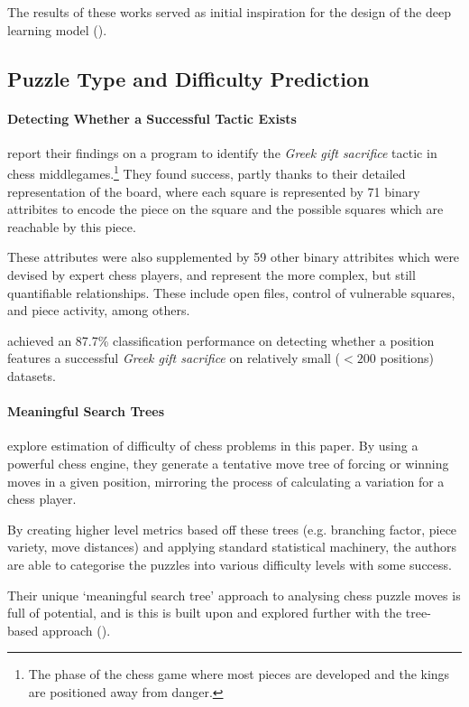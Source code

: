 The results of these works served as initial inspiration for the design of the
deep learning model ().

\subsection{Puzzle Type and Difficulty Prediction}

\paragraph{Detecting Whether a Successful Tactic
Exists}\citet{middleGamePatterns} report their findings on a program to
identify the \emph{Greek gift sacrifice} tactic in chess
middlegames.\footnote{The phase of the chess game where most pieces are
developed and the kings are positioned away from danger.} They found success,
partly thanks to their detailed representation of the board, where each square
is represented by 71 binary attribites \citep{middleGamePatterns} to encode the
piece on the square and the possible squares which are reachable by this piece. 

These attributes were also supplemented by 59 other binary attribites which
were devised by expert chess players, and represent the more complex, but still
quantifiable relationships. These include open files, control of vulnerable
squares, and piece activity, among others.

\citet{middleGamePatterns} achieved an 87.7\% classification performance on
detecting whether a position features a successful \emph{Greek gift sacrifice}
on relatively small ($<200$ positions) datasets. 

\paragraph{Meaningful Search Trees}\citet{chessTrees} explore estimation of
difficulty of chess problems in this paper. By using a powerful chess engine,
they generate a tentative move tree of forcing or winning moves in a given
position, mirroring the process of calculating a variation for a chess player. 

By creating higher level metrics based off these trees (e.g. branching factor,
piece variety, move distances) and applying standard statistical machinery, the
authors are able to categorise the puzzles into various difficulty levels with
some success.

Their unique `meaningful search tree' \citep{chessTrees} approach to analysing
chess puzzle moves is full of potential, and is this is built upon and explored
further with the tree-based approach ().

